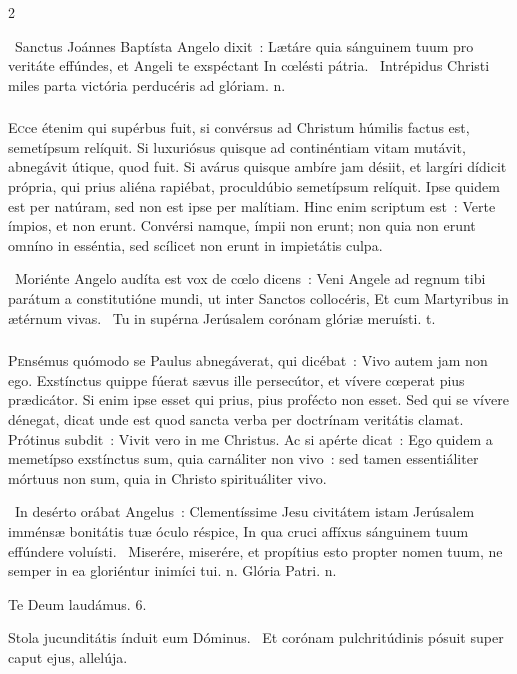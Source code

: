 \documentclass[9pt,twoside]{extarticle}
\begin{document}
\begin{multicols}{2}
\begin{tightlist}{}
~Sanctus Joánnes Baptísta Angelo dixit~: Lætáre quia sánguinem tuum pro veritáte effúndes, et Angeli te exspéctant \textred{*} In cœlésti pátria.
~Intrépidus Christi miles parta victória perducéris ad glóriam. n.
\end{tightlist}

\subsubsection*{\center {}}
\lettrine{E}cce étenim qui supérbus fuit, si convérsus ad Christum húmilis factus est, semetípsum relíquit. Si luxuriósus quisque ad continéntiam vitam mutávit, abnegávit útique, quod fuit. Si avárus quisque ambíre jam désiit, et largíri dídicit própria, qui prius aliéna rapiébat, proculdúbio semetípsum relíquit. Ipse quidem est per natúram, sed non est ipse per malítiam. Hinc enim scriptum est~: Verte ímpios, et non erunt. Convérsi namque, ímpii non erunt; non quia non erunt omníno in esséntia, sed scílicet non erunt in impietátis culpa.

\begin{tightlist}{}
\item {}~Moriénte Angelo audíta est vox de cœlo dicens~: Veni Angele ad regnum tibi parátum a constitutióne mundi, ut inter Sanctos collocéris, \textred{*} Et cum Martyribus in ætérnum vivas.
~Tu in supérna Jerúsalem corónam glóriæ meruísti. t.
\end{tightlist}

\subsubsection*{\center {}}
\lettrine{P}ensémus quómodo se Paulus abnegáverat, qui dicébat~: Vivo autem jam non ego. Exstínctus quippe fúerat sævus ille persecútor, et vívere cœperat pius prædicátor. Si enim ipse esset qui prius, pius profécto non esset. Sed qui se vívere dénegat, dicat unde est quod sancta verba per doctrínam veritátis clamat. Prótinus subdit~: Vivit vero in me Christus. Ac si apérte dicat~: Ego quidem a memetípso exstínctus sum, quia carnáliter non vivo~: sed tamen essentiáliter mórtuus non sum, quia in Christo spirituáliter vivo.

\begin{tightlist}{}
\item {}~In desérto orábat Angelus~: Clementíssime Jesu civitátem istam Jerúsalem imménsæ bonitátis tuæ óculo réspice, \textred{*} In qua cruci affíxus sánguinem tuum effúndere voluísti.
~Miserére, miserére, et propítius esto propter nomen tuum, ne semper in ea gloriéntur inimíci tui. n. Glória Patri. n.
\item Te Deum laudámus. 6.
\item {} Stola jucunditátis índuit eum Dóminus. ~Et corónam pulchritúdinis pósuit super caput ejus, allelúja.
\end{tightlist}


\end{multicols}
\end{document}
